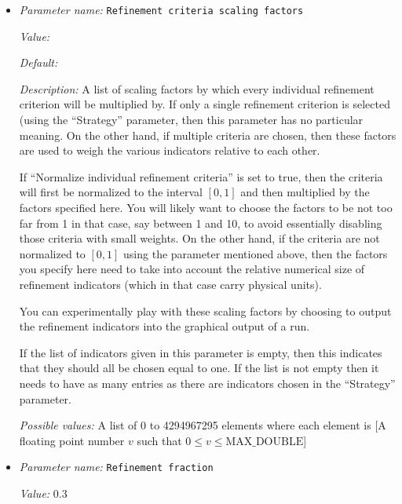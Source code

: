 \begin{itemize}
{\it Possible values:} Any one of plus, max
\item {\it Parameter name:} {\tt Refinement criteria scaling factors}
\label{parameters:Mesh refinement/Refinement criteria scaling factors}
\label{parameters:Mesh_20refinement/Refinement_20criteria_20scaling_20factors}


{\it Value:} 


{\it Default:} 


{\it Description:} A list of scaling factors by which every individual refinement criterion will be multiplied by. If only a single refinement criterion is selected (using the ``Strategy'' parameter, then this parameter has no particular meaning. On the other hand, if multiple criteria are chosen, then these factors are used to weigh the various indicators relative to each other. 

If ``Normalize individual refinement criteria'' is set to true, then the criteria will first be normalized to the interval $[0,1]$ and then multiplied by the factors specified here. You will likely want to choose the factors to be not too far from 1 in that case, say between 1 and 10, to avoid essentially disabling those criteria with small weights. On the other hand, if the criteria are not normalized to $[0,1]$ using the parameter mentioned above, then the factors you specify here need to take into account the relative numerical size of refinement indicators (which in that case carry physical units).

You can experimentally play with these scaling factors by choosing to output the refinement indicators into the graphical output of a run.

If the list of indicators given in this parameter is empty, then this indicates that they should all be chosen equal to one. If the list is not empty then it needs to have as many entries as there are indicators chosen in the ``Strategy'' parameter.


{\it Possible values:} A list of 0 to 4294967295 elements where each element is [A floating point number $v$ such that $0 \leq v \leq \text{MAX\_DOUBLE}$]
\item {\it Parameter name:} {\tt Refinement fraction}
\label{parameters:Mesh refinement/Refinement fraction}
\label{parameters:Mesh_20refinement/Refinement_20fraction}


{\it Value:} 0.3



\end{itemize}
